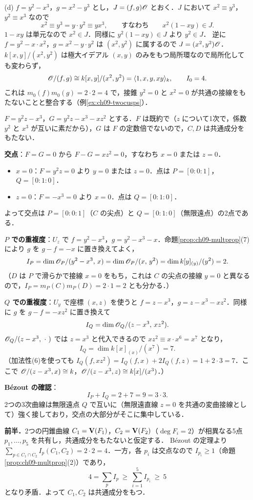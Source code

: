 (d) $f=y^2-x^3$，$g=x^2-y^3$ とし，$J=(f,g)\mathscr{O}$ とおく．$J$ において $x^2\equiv y^3$，$y^2\equiv x^3$ なので
\[
  x^2\equiv y^3=y\cdot y^2\equiv yx^3,\qquad\text{すなわち}\qquad x^2(1-xy)\in J .
\]
$1-xy$ は単元なので $x^2\in J$．同様に $y^2(1-xy)\in J$ より $y^2\in J$．
逆に $f=y^2-x\cdot x^2$，$g=x^2-y\cdot y^2$ は $(x^2,y^2)$ に属するので $J=(x^2,y^2)\mathscr{O}$．
$k[x,y]/(x^2,y^2)$ は極大イデアル $(x,y)$ のみをもつ局所環なので局所化しても変わらず，
\[
  \mathscr{O}/(f,g)\cong k[x,y]/(x^2,y^2)=\langle1,x,y,xy\rangle_k,\qquad I_0=4 .
\]
これは $m_0(f)m_0(g)=2\cdot2=4$ で，接錐 $y^2=0$ と $x^2=0$ が共通の接線をもたないことと整合する（例\ref{ex:ch09-twocusps}）．

$F=y^2z-x^3$，$G=y^2z-x^3-xz^2$ とする．$F$ は既約で（$z$ について1次で，係数 $y^2$ と $x^3$ が互いに素だから），$G$ は $F$ の定数倍でないので，$C,D$ は共通成分をもたない．

\textbf{交点}：$F=G=0$ から $F-G=xz^2=0$，すなわち $x=0$ または $z=0$．
\begin{itemize}
  \item $x=0$：$F=y^2z=0$ より $y=0$ または $z=0$．点は $P=[0:0:1]$，$Q=[0:1:0]$．
  \item $z=0$：$F=-x^3=0$ より $x=0$．点は $Q=[0:1:0]$．
\end{itemize}
よって交点は $P=[0:0:1]$（$C$ の尖点）と $Q=[0:1:0]$（無限遠点）の2点である．

\textbf{$P$ での重複度}：$U_z$ で $f=y^2-x^3$，$g=y^2-x^3-x$．命題\ref{prop:ch09-multprop}(7) により $g$ を $g-f=-x$ に置き換えてよく，
\[
  I_P=\dim\mathscr{O}_P/(y^2-x^3,\,x)=\dim\mathscr{O}_P/(x,\,y^2)=\dim k[y]_{(y)}/(y^2)=2 .
\]
（$D$ は $P$ で滑らかで接線 $x=0$ をもち，これは $C$ の尖点の接線 $y=0$ と異なるので，$I_P=m_P(C)m_P(D)=2\cdot1=2$ とも分かる．）

\textbf{$Q$ での重複度}：$U_y$ で座標 $(x,z)$ を使うと $f=z-x^3$，$g=z-x^3-xz^2$．同様に $g$ を $g-f=-xz^2$ に置き換えて
\[
  I_Q=\dim\mathscr{O}_Q/(z-x^3,\,xz^2).
\]
$\mathscr{O}_Q/(z-x^3,\ \cdot\ )$ では $z=x^3$ と代入できるので $xz^2\equiv x\cdot x^6=x^7$ となり，
\[
  I_Q=\dim k[x]_{(x)}/(x^7)=7 .
\]
（加法性(6)を使っても $I_Q(f,xz^2)=I_Q(f,x)+2I_Q(f,z)=1+2\cdot3=7$．ここで $\mathscr{O}/(z-x^3,x)\cong k$，$\mathscr{O}/(z-x^3,z)\cong k[x]/(x^3)$．）

\textbf{B\'ezout の確認}：
\[
  I_P+I_Q=2+7=9=3\cdot3 .
\]
2つの3次曲線は無限遠点 $Q$ で互いに（無限遠直線 $z=0$ を共通の変曲接線として）強く接しており，交点の大部分がそこに集中している．

\textbf{前半．}2つの円錐曲線 $C_1=\mathbf{V}(F_1)$，$C_2=\mathbf{V}(F_2)$（$\deg F_i=2$）が相異なる5点 $p_1,\dots,p_5$ を共有し，共通成分をもたないと仮定する．
B\'ezout の定理より $\sum_{p\in C_1\cap C_2}I_p(C_1,C_2)=2\cdot2=4$．一方，各 $p_i$ は交点なので $I_{p_i}\ge1$（命題\ref{prop:ch09-multprop}(2)）であり，
\[
  4=\sum_pI_p\ \ge\ \sum_{i=1}^5I_{p_i}\ \ge\ 5
\]
となり矛盾．よって $C_1,C_2$ は共通成分をもつ．

